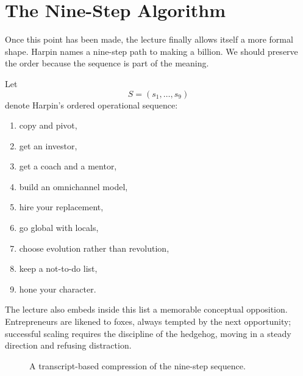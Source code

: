 \section{The Nine-Step Algorithm}

Once this point has been made, the lecture finally allows itself a more formal shape. Harpin names a nine-step path to making a billion. We should preserve the order because the sequence is part of the meaning.

\begin{definition}
Let
\[
S=(s_1,\dots,s_9)
\]
denote Harpin's ordered operational sequence:
\begin{enumerate}
\item copy and pivot,
\item get an investor,
\item get a coach and a mentor,
\item build an omnichannel model,
\item hire your replacement,
\item go global with locals,
\item choose evolution rather than revolution,
\item keep a not-to-do list,
\item hone your character.
\end{enumerate}
\end{definition}

The lecture also embeds inside this list a memorable conceptual opposition. Entrepreneurs are likened to foxes, always tempted by the next opportunity; successful scaling requires the discipline of the hedgehog, moving in a steady direction and refusing distraction.

\begin{figure}[h]
\centering
{}
\caption{A transcript-based compression of the nine-step sequence.}
\end{figure}

